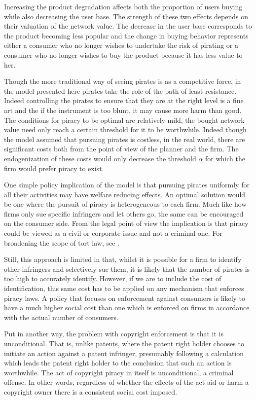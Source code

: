 \documentclass[11pt]{article}
\begin{document}
Increasing the product degradation affects both the proportion of users buying while also decreasing the user base. The strength of these two effects depends on their valuation of the network value. The decrease in the user base corresponds to the product becoming less popular and the change in buying behavior represents either a consumer who no longer wishes to undertake the risk of pirating or a consumer who no longer wishes to buy the product because it has less value to her.

Though the more traditional way of seeing pirates is as a competitive force, in the model presented here pirates take the role of the path of least resistance. Indeed controlling the pirates to ensure that they are at the right level is a fine art and the if the instrument is too blunt, it may cause more harm than good. The conditions for piracy to be optimal are relatively mild, the bought network value need only reach a certain threshold for it to be worthwhile. Indeed though the model assumed that pursuing pirates is costless, in the real world, there are significant costs both from the point of view of the planner and the firm. The endogenization of these costs would only decrease the threshold $\alpha$ for which the firm would prefer piracy to exist.

One simple policy implication of the model is that pursuing pirates uniformly for all their activities may have welfare reducing effects. An optimal solution would be one where the pursuit of piracy is  heterogeneous to each firm. Much like how firms only sue specific infringers and let others go, the same can be encouraged on the consumer side. From the legal point of view the implication is that piracy could be viewed as a civil or corporate issue and not a criminal one. For broadening the scope of tort law, see \citep{DF96}. 

Still, this approach is limited in that, whilst it is possible for a firm to identify other infringers and selectively sue them, it is likely that the number of pirates is too high to accurately identify. However, if we are to include the cost of identification, this same cost has to be applied on any mechanism that enforces piracy laws. A policy that focuses on enforcement against consumers is likely to have a much higher social cost than one which is enforced on firms in accordance with the actual number of consumers. 

Put in another way, the problem with copyright enforcement is that it is unconditional. That is, unlike patents, where the patent right holder chooses to initiate an action against a patent infringer, presumably following a calculation which leads the patent right holder to the conclusion that such an action is worthwhile. The act of copyright piracy in itself is unconditional, a criminal offense. In other words, regardless of whether the effects of the act aid or harm a copyright owner there is a consistent social cost imposed. 
\end{document}
